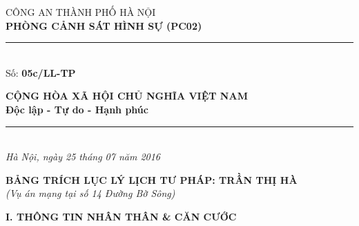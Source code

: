 \documentclass[12pt,a4paper]{article}
\begin{document}
\noindent
\begin{minipage}[t]{0.46\textwidth}
    \begin{center}
        \fontsize{11pt}{13pt}\selectfont
        CÔNG AN THÀNH PHỐ HÀ NỘI\\
        \textbf{PHÒNG CẢNH SÁT HÌNH SỰ (PC02)}\\[-0.2em]
        \rule{3.2cm}{0.6pt}\\[0.25cm]
        \fontsize{11pt}{13pt}\selectfont Số: \textbf{05c/LL-TP}
    \end{center}
\end{minipage}
\hfill
\begin{minipage}[t]{0.52\textwidth}
    \begin{center}
        \fontsize{11pt}{13pt}\selectfont
        \textbf{CỘNG HÒA XÃ HỘI CHỦ NGHĨA VIỆT NAM}\\
        \textbf{Độc lập - Tự do - Hạnh phúc}\\[-0.2em]
        \rule{3.6cm}{0.6pt}\\[0.25cm]
        \textit{Hà Nội, ngày 25 tháng 07 năm 2016}
    \end{center}
\end{minipage}

\vspace{0.5cm}

\begin{center}
    \textbf{\Large BẢNG TRÍCH LỤC LÝ LỊCH TƯ PHÁP: TRẦN THỊ HÀ}\\[0.15cm]
    \textit{(Vụ án mạng tại số 14 Đường Bờ Sông)}
\end{center}

\vspace{0.3cm}



\vspace{0.3cm}\noindent\textbf{\large I. THÔNG TIN NHÂN THÂN \& CĂN CƯỚC}\\[0.15cm]
\end{document}
